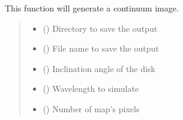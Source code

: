 \documentclass[a4paper,11pt,english]{sphinxmanual}
\begin{document}
\begin{fulllineitems}
\begin{fulllineitems}
\label{\detokenize{radmc3d:simulate.generate_simulation.generate_continuum}}
\pysigstartsignatures
\pysiglinewithargsret
{}
{\sphinxparamcomma {}\sphinxparamcomma {}\sphinxparamcomma {}\sphinxparamcomma {}\sphinxparamcomma {}\sphinxparamcomma {}\sphinxparamcomma {}\sphinxparamcomma {}}
{}
\pysigstopsignatures
\sphinxAtStartPar
This function will generate a continuum image.
\begin{quote}\begin{description}
\begin{itemize}
\item {} 
\sphinxAtStartPar
{} () \textendash{} Directory to save the output

\item {} 
\sphinxAtStartPar
{} () \textendash{} File name to save the output

\item {} 
\sphinxAtStartPar
{} () \textendash{} Inclination angle of the disk

\item {} 
\sphinxAtStartPar
{} () \textendash{} Wavelength to simulate

\item {} 
\sphinxAtStartPar
{} () \textendash{} Number of map’s pixels


\end{itemize}
\end{description}
\end{quote}
\end{fulllineitems}
\end{fulllineitems}
\end{document}
